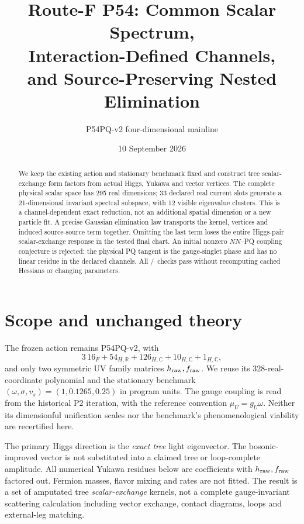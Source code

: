 \documentclass[11pt]{article}
\title{Route-F P54: Common Scalar Spectrum,\\Interaction-Defined Channels,\\and Source-Preserving Nested Elimination}
\author{P54PQ-v2 four-dimensional mainline}
\date{10 September 2026}
\begin{document}
\maketitle
\begin{abstract}
We keep the existing action and stationary benchmark fixed and construct
tree scalar-exchange form factors from actual Higgs, Yukawa and vector
vertices. The complete physical scalar space has 295 real dimensions;
33 declared real current slots generate a 21-dimensional invariant
spectral subspace, with 12 visible eigenvalue clusters. This is a
channel-dependent exact reduction, not an additional spatial dimension
or a new particle fit. A precise Gaussian elimination law transports the
kernel, vertices and induced source-source term together. Omitting the
last term loses the entire Higgs-pair scalar-exchange response in the
tested final chart. An initial nonzero $NN$--PQ coupling conjecture is
rejected: the physical PQ tangent is the gauge-singlet phase and has no
linear residue in the declared channels. All \ChecksPassed/\ChecksTotal\
checks pass without recomputing cached Hessians or changing parameters.
\end{abstract}

\section{Scope and unchanged theory}
The frozen action remains P54PQ-v2, with
\begin{equation}
3\,16_F+54_{H,\mathbb R}+126_{H,\mathbb C}
+10_{H,\mathbb C}+1_{H,\mathbb C},
\end{equation}
and only two symmetric UV family matrices $h_{\rm raw},f_{\rm raw}$.
We reuse its 328-real-coordinate polynomial and the stationary benchmark
$(\omega,\sigma,v_s)=(1,0.1265,0.25)$ in program units. The gauge coupling
is read from the historical P2 iteration, with the reference convention
$\mu_U=g_U\omega$. Neither its dimensionful unification scales nor the
benchmark's phenomenological viability are recertified here.

The primary Higgs direction is the \emph{exact tree} light eigenvector.
The bosonic-improved vector is not substituted into a claimed tree or
loop-complete amplitude. All numerical Yukawa residues below are
coefficients with $h_{\rm raw},f_{\rm raw}$ factored out. Fermion masses,
flavor mixing and rates are not fitted. The result is a set of amputated
tree \emph{scalar-exchange} kernels, not a complete gauge-invariant
scattering calculation including vector exchange, contact diagrams,
loops and external-leg matching.
\end{document}
